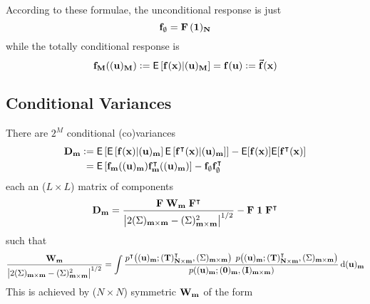 \documentclass[a4paper, margin=1in, reqno]{RAMArticle}
\begin{document}
		According to these formulae, the unconditional response is just
		\begin{equation*}
			\mathbf{f}_{\emptyset} = \mathbf{F} \, (\mathbf{1})_{\mathbf{N}}
		\end{equation*}
		while the totally conditional response is
		\begin{equation*}
			\mathbf{f}_{\mathbf{M}}((\mathbf{u})_{\mathbf{M}}) 
			\mathrel{\mathop:}= \mathsf{E}\left[\mathbf{f}(\mathbf{x}) \vert (\mathbf{u})_{\mathbf{M}} \right] = \mathbf{f}(\mathbf{u}) \mathrel{\mathop:}= \vec{\mathbf{f}}(\mathbf{x})\\ 
		\end{equation*}


	\subsection{Conditional Variances}
		There are \(2^{M}\) conditional (co)variances
		\begin{align*}
			\mathbf{D}_{\mathbf{m}} &\mathrel{\mathop:}= 
				\mathsf{E}\left[
					\mathsf{E}\left[\mathbf{f}(\mathbf{x}) \vert (\mathbf{u})_{\mathbf{m}} \right]
					\mathsf{E}\left[\mathbf{f}^{\intercal}(\mathbf{x}) \vert (\mathbf{u})_{\mathbf{m}} \right]
				\right]
				- \mathsf{E}[\mathbf{f}(\mathbf{x})] \mathsf{E}[\mathbf{f}^{\intercal}(\mathbf{x})] \\
			&\phantom{:}= 
				\mathsf{E}\left[
					\mathbf{f}_{\mathbf{m}}((\mathbf{u})_{\mathbf{m}})\mathbf{f}^{\intercal}_{\mathbf{m}}((\mathbf{u})_{\mathbf{m}})
				\right]
				- \mathbf{f}_{\emptyset}\mathbf{f}^{\intercal}_{\emptyset}
		\end{align*}
		each an (\(L\times L\)) matrix of components
		\begin{equation*}
			\mathbf{D}_{\mathbf{m}} = 
			\frac
				{\mathbf{F} \; \mathbf{W}_{\mathbf{m}} \; \mathbf{F}^{\intercal}}
				{\left\lvert2(\Sigma)_{\mathbf{m}\times\mathbf{m}} - (\Sigma)_{\mathbf{m}\times\mathbf{m}}^{2}\right\rvert^{1/2}}
			- \mathbf{F}\; \mathbf{1} \;\mathbf{F}^{\intercal} 
		\end{equation*}
		such that
		\begin{equation}\label{eq:ANOVA:qformula}
			\frac
				{\mathbf{W}_{\mathbf{m}}}
				{\left\lvert2(\Sigma)_{\mathbf{m}\times\mathbf{m}} - (\Sigma)_{\mathbf{m}\times\mathbf{m}}^{2}\right\rvert^{1/2}}
			=
				\int
				\frac{
					p^{\intercal}\!\left((\mathbf{u})_{\mathbf{m}} ; (\mathbf{T})_{\mathbf{N}\times\mathbf{m}}^{\intercal}, (\Sigma)_{\mathbf{m}\times\mathbf{m}}\right)
					\; p\!\left((\mathbf{u})_{\mathbf{m}} ; (\mathbf{T})_{\mathbf{N}\times\mathbf{m}}^{\intercal}, (\Sigma)_{\mathbf{m}\times\mathbf{m}}\right)}
					{p\!\left((\mathbf{u})_{\mathbf{m}} ; (\mathbf{0})_{\mathbf{m}},(\mathbf{I})_{\mathbf{m}\times\mathbf{m}}\right)}
		\, \mathrm{d} (\mathbf{u})_{\mathbf{m}}
		\end{equation}
		This is achieved by (\(N\times N\)) symmetric \(\mathbf{W}_{\mathbf{m}}\) of the form
\end{document}
